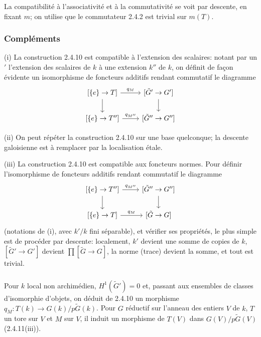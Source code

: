\documentclass[12pt,a4paper]{article}
\theoremstyle{plain}
\theoremstyle{definition}
\theoremstyle{remark}
\begin{document}
La compatibilit\'e \`a l'associativit\'e et \`a la commutativit\'e se voit par descente, en fixant $m$; on utilise que le commutateur 2.4.2 est trivial sur $m(T)$.

\subsubsection{Compl\'ements}

(i) La construction 2.4.10 est compatible \`a l'extension des scalaires: notant par un $'$ l'extension des scalaires de $k$ \`a une extension $k''$ de $k$, on d\'efinit de fa\c{c}on \'evidente un isomorphisme de foncteurs additifs rendant commutatif le diagramme
\[
\begin{tikzcd}
{[\{e\} \to T]} \arrow[r, "q_M"] \arrow[d] & {[\tilde{G}' \to G']} \arrow[d] \\
{[\{e\} \to T'']} \arrow[r, "q_{M''}"] & {[\tilde{G}'' \to G'']}
\end{tikzcd}
\]

(ii) On peut r\'ep\'eter la construction 2.4.10 sur une base quelconque; la descente galoisienne est \`a remplacer par la localisation \'etale.

(iii) La construction 2.4.10 est compatible aux foncteurs normes. Pour d\'efinir l'isomorphisme de foncteurs additifs rendant commutatif le diagramme
\[
\begin{tikzcd}
{[\{e\} \to T'']} \arrow[r, "q_{M''}"] \arrow[d] & {[\tilde{G}'' \to G'']} \arrow[d] \\
{[\{e\} \to T]} \arrow[r, "q_M"] & {[\tilde{G} \to G]}
\end{tikzcd}
\]
(notations de (i), avec $k'/k$ fini s\'eparable), et v\'erifier ses propri\'et\'es, le plus simple est de proc\'eder par descente: localement, $k'$ devient une somme de copies de $k$, $[\tilde{G}' \to G']$ devient $\prod [\tilde{G} \to G]$, la norme (trace) devient la somme, et tout est trivial.

\subsubsection{}

Pour $k$ local non archim\'edien, $H^1(\tilde{G}') = 0$ et, passant aux ensembles de classes d'isomorphie d'objets, on d\'eduit de 2.4.10 un morphisme $q_M: T(k) \to G(k)/p\tilde{G}(k)$. Pour $G$ r\'eductif sur l'anneau des entiers $V$ de $k$, $T$ un tore sur $V$ et $M$ sur $V$, il induit un morphisme de $T(V)$ dans $G(V)/p\tilde{G}(V)$ (2.4.11(iii)).
\end{document}
